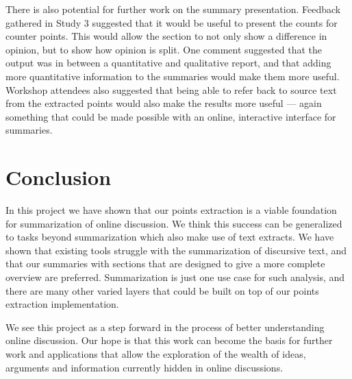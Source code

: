    There is also potential for further work on the summary presentation. Feedback gathered in Study 3 suggested that it would be useful to present the counts for counter points. This would allow the section to not only show a difference in opinion, but to show how opinion is split. One comment suggested that the output was in between a quantitative and qualitative report, and that adding more quantitative information to the summaries would make them more useful. Workshop attendees also suggested that being able to refer back to source text from the extracted points would also make the results more useful --- again something that could be made possible with an online, interactive interface for summaries.

  \section{Conclusion}
    In this project we have shown that our points extraction is a viable foundation for summarization of online discussion. We think this success can be generalized to tasks beyond summarization which also make use of text extracts. We have shown that existing tools struggle with the summarization of discursive text, and that our summaries with sections that are designed to give a more complete overview are preferred. Summarization is just one use case for such analysis, and there are many other varied layers that could be built on top of our points extraction implementation.

    We see this project as a step forward in the process of better understanding online discussion. Our hope is that this work can become the basis for further work and applications that allow the exploration of the wealth of ideas, arguments and information currently hidden in online discussions.
